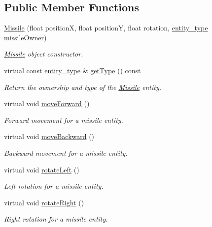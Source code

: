 \subsection*{Public Member Functions}
\begin{DoxyCompactItemize}
\item 
\hyperlink{classMissile_a2f930ea9ba87704d2ba75b0299f698c2}{Missile} (float position\-X, float position\-Y, float rotation, \hyperlink{Structures_8h_a6d8f83e710b27d4f86c45f0bb77066e3}{entity\-\_\-type} missile\-Owner)
\begin{DoxyCompactList}\small\item\em \hyperlink{classMissile}{Missile} object constructor. \end{DoxyCompactList}\item 
virtual const \hyperlink{Structures_8h_a6d8f83e710b27d4f86c45f0bb77066e3}{entity\-\_\-type} \& \hyperlink{classMissile_a67874a53d50f63065bf1f63803558513}{get\-Type} () const 
\begin{DoxyCompactList}\small\item\em Return the ownership and type of the \hyperlink{classMissile}{Missile} entity. \end{DoxyCompactList}\item 
virtual void \hyperlink{classMissile_a4b6a45a5129b97a6e5383123dffab0c3}{move\-Forward} ()
\begin{DoxyCompactList}\small\item\em Forward movement for a missile entity. \end{DoxyCompactList}\item 
virtual void \hyperlink{classMissile_a8d8348b91961ff0c163d7d24bd9599a8}{move\-Backward} ()
\begin{DoxyCompactList}\small\item\em Backward movement for a missile entity. \end{DoxyCompactList}\item 
virtual void \hyperlink{classMissile_a1c7ed80bd656b0af5b3872f4225978e3}{rotate\-Left} ()
\begin{DoxyCompactList}\small\item\em Left rotation for a missile entity. \end{DoxyCompactList}\item 
virtual void \hyperlink{classMissile_aeccfdf94a02fa86545296f4c38857ef8}{rotate\-Right} ()
\begin{DoxyCompactList}\small\item\em Right rotation for a missile entity. \end{DoxyCompactList}\item 

\end{DoxyCompactItemize}
